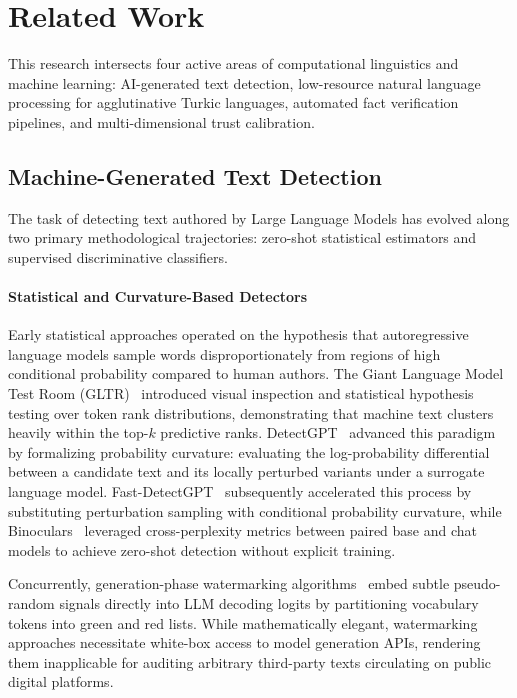 \section{Related Work}
\label{sec:related_work}

This research intersects four active areas of computational linguistics and machine learning: AI-generated text detection, low-resource natural language processing for agglutinative Turkic languages, automated fact verification pipelines, and multi-dimensional trust calibration.

\subsection{Machine-Generated Text Detection}
The task of detecting text authored by Large Language Models has evolved along two primary methodological trajectories: zero-shot statistical estimators and supervised discriminative classifiers.

\paragraph{Statistical and Curvature-Based Detectors}
Early statistical approaches operated on the hypothesis that autoregressive language models sample words disproportionately from regions of high conditional probability compared to human authors. The Giant Language Model Test Room (GLTR)~\citep{gehrmann2019gltr} introduced visual inspection and statistical hypothesis testing over token rank distributions, demonstrating that machine text clusters heavily within the top-$k$ predictive ranks. DetectGPT~\citep{mitchell2023detectgpt} advanced this paradigm by formalizing probability curvature: evaluating the log-probability differential between a candidate text and its locally perturbed variants under a surrogate language model. Fast-DetectGPT~\citep{bao2024fastdetectgpt} subsequently accelerated this process by substituting perturbation sampling with conditional probability curvature, while Binoculars~\citep{hans2024binoculars} leveraged cross-perplexity metrics between paired base and chat models to achieve zero-shot detection without explicit training. 

Concurrently, generation-phase watermarking algorithms~\citep{kirchenbauer2023watermark} embed subtle pseudo-random signals directly into LLM decoding logits by partitioning vocabulary tokens into green and red lists. While mathematically elegant, watermarking approaches necessitate white-box access to model generation APIs, rendering them inapplicable for auditing arbitrary third-party texts circulating on public digital platforms.

